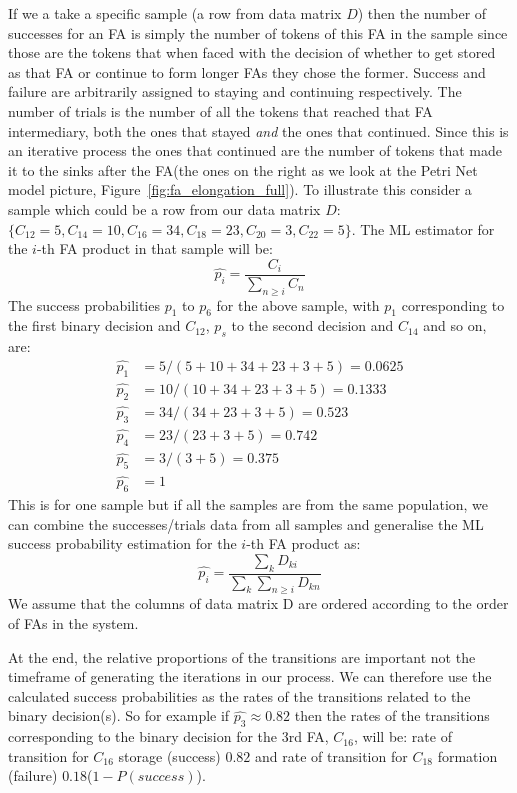 If we a take a specific sample (a row from data matrix $D$) then the
number of successes for an FA is simply the number of tokens of
this FA in the sample since those are the tokens that when faced with
the decision of whether to get stored as that FA or continue to form
longer FAs they chose the former. Success and failure are arbitrarily
assigned to staying and continuing respectively. The number of trials
is the number of all the tokens that reached that FA intermediary, both
the ones that stayed \textit{and} the ones that continued. Since this
is an iterative process the ones that continued are the number of
tokens that made it to the sinks after the FA(the ones on the right as
we look at the Petri Net model picture,
Figure~\ref{fig:fa_elongation_full}). To illustrate this consider a
sample which could be a row from our data matrix $D$: $\{C_{12}=5,
C_{14}=10, C_{16}=34, C_{18}=23, C_{20}=3, C_{22}=5\}$. The ML
estimator for the $i$-th FA product in that sample will be:
\begin{equation*}
\hat{p_i} = \frac{C_i}{\sum_{n \geq i} C_n}
\end{equation*}
The success probabilities $p_1$ to $p_6$ for the above sample, with $p_1$ corresponding to
the first binary decision and $C_{12}$, $p_s$ to the second decision
and $C_{14}$ and so on, are:
\begin{align*}
\hat{p_1} & = 5/(5+10+34+23+3+5) = 0.0625\\
\hat{p_2} & = 10 / (10+34+23+3+5) = 0.1333\\
\hat{p_3} & = 34 / (34+23+3+5) = 0.523\\
\hat{p_4} & = 23 / (23+3+5) = 0.742\\
\hat{p_5} & = 3 / (3+5) = 0.375\\
\hat{p_6} & = 1
\end{align*}
This is for one sample but if all the samples are from the same
population, we can combine the successes/trials data from all
samples and generalise the ML success probability estimation for the
$i$-th FA product as:
\begin{equation*}
\hat{p_i} = \frac{\sum_k D_{ki}}{\sum_k \sum_{n\geq i} D_{kn}}
\end{equation*}
We assume that the columns of data matrix D are ordered according to
the order of FAs in the system.

At the end, the relative proportions of the transitions are important not the timeframe of generating the iterations in our process. We can therefore
use the calculated success probabilities as the rates of the
transitions related to the binary decision(s). So for example if
$\hat{p_3}\approx0.82$ then the rates of the transitions corresponding to the
binary decision for the 3rd FA, $C_{16}$, will be: rate of transition
for $C_{16}$ storage (success) $0.82$ and rate of transition for
$C_{18}$ formation (failure) $0.18$($1-P(success)$).


